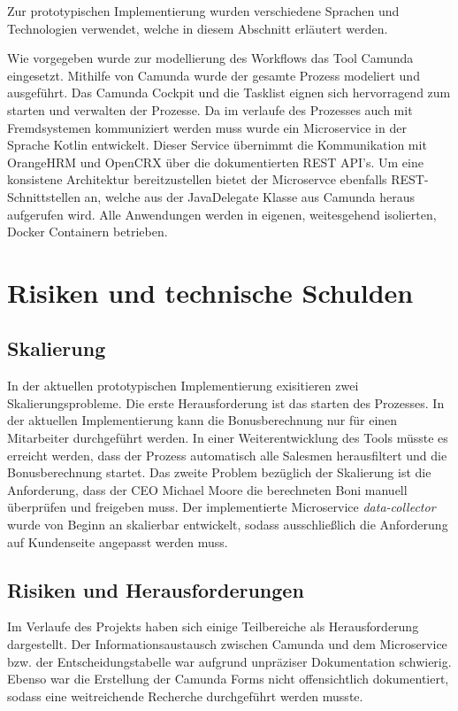 \documentclass[]{article}
\begin{document}
Zur prototypischen Implementierung wurden verschiedene Sprachen und Technologien verwendet, welche in diesem Abschnitt erläutert werden.

Wie vorgegeben wurde zur modellierung des Workflows das Tool Camunda eingesetzt. Mithilfe von Camunda wurde der gesamte Prozess modeliert und ausgeführt. Das Camunda Cockpit und die Tasklist eignen sich hervorragend zum starten und verwalten der Prozesse. 
Da im verlaufe des Prozesses auch mit Fremdsystemen kommuniziert werden muss wurde ein Microservice in der Sprache Kotlin entwickelt. Dieser Service übernimmt die Kommunikation mit OrangeHRM und OpenCRX über die dokumentierten REST API's.
Um eine konsistene Architektur bereitzustellen bietet der Microservce ebenfalls REST-Schnittstellen an, welche aus der JavaDelegate Klasse aus Camunda heraus aufgerufen wird. 
Alle Anwendungen werden in eigenen, weitesgehend isolierten, Docker Containern betrieben.


\hypertarget{section-technical-risks}{%
\section{Risiken und technische
Schulden}\label{section-technical-risks}}
\subsection{Skalierung}
In der aktuellen prototypischen Implementierung exisitieren zwei Skalierungsprobleme. Die erste Herausforderung ist das starten des Prozesses. In der aktuellen Implementierung kann die Bonusberechnung nur für einen Mitarbeiter durchgeführt werden. In einer Weiterentwicklung des Tools müsste es erreicht werden, dass der Prozess automatisch alle Salesmen herausfiltert und die Bonusberechnung startet. 
Das zweite Problem bezüglich der Skalierung ist die Anforderung, dass der CEO Michael Moore die berechneten Boni manuell überprüfen und freigeben muss. 
Der implementierte Microservice \emph{data-collector} wurde von Beginn an skalierbar entwickelt, sodass ausschließlich die Anforderung auf Kundenseite angepasst werden muss.

\subsection{Risiken und Herausforderungen}
Im Verlaufe des Projekts haben sich einige Teilbereiche als Herausforderung dargestellt. Der Informationsaustausch zwischen Camunda und dem Microservice bzw. der Entscheidungstabelle war aufgrund unpräziser Dokumentation schwierig. Ebenso war die Erstellung der Camunda Forms nicht offensichtlich dokumentiert, sodass eine weitreichende Recherche durchgeführt werden musste.
\end{document}
